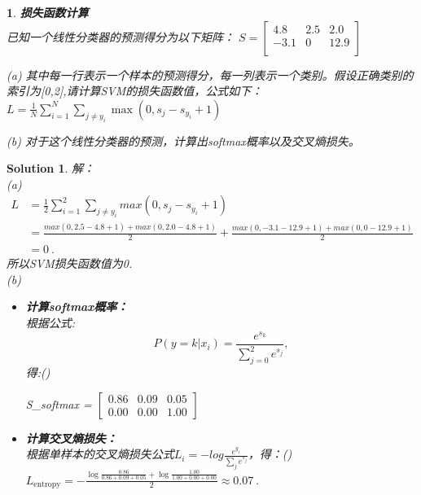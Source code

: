 \documentclass{article}
\title{\Huge\Assignment}
\author{\ID \Name \quad\href{mailto:tianym2022@smail.nju.edu.cn}{\color{magenta}\Email}}
\date{\today}
\newcommand{\myred}[1]{{\color{red}{#1}}} %
\theoremstyle{Problem}
\newtheorem{prob}{}
\theoremstyle{Solution}
\newtheorem*{sol}{Solution}
\begin{document}
	\maketitle
	\begin{prob}
		\textbf{损失函数计算}\\
		已知一个线性分类器的预测得分为以下矩阵：
		$
		S = \begin{bmatrix}
			4.8&2.5&2.0\\
			-3.1&0&12.9\\
		\end{bmatrix}
		$
		
		(a) 其中每一行表示一个样本的预测得分，每一列表示一个类别。假设正确类别的索引为[0,2],请计算SVM的损失函数值，公式如下：
		$
		L = \frac{1}{N} \sum_{i=1}^{N} \sum_{j \neq y_i} \max(0, s_j - s_{y_i} + 1)
		$
		
		
		(b) 对于这个线性分类器的预测，计算出softmax概率以及交叉熵损失。
	\end{prob}
	
	\begin{sol}
		解：\\
	(a)  \begin{align*}
		L &= \frac{1}{2}\sum_{i=1}^{2}\sum_{j\neq y_i}max(0,s_j-s_{y_i}+1)\\
		&= \frac{max(0,2.5-4.8+1)+max(0,2.0-4.8+1)}{2} + \frac{max(0,-3.1-12.9+1)+max(0,0-12.9+1)}{2}\\
		&= 0\ .
	\end{align*}
	所以SVM损失函数值为0.\\
	(b) \begin{itemize}
		\item \textbf{计算softmax概率：}\\
		根据公式:
		\[P(y=k|x_i) = \frac{e^{s_k}}{\sum_{j=0}^2 e^{s_j}},\]得:(\myred{注意我这里都保留了两位小数})
		
		S\_{softmax} = $\begin{bmatrix}
		0.86	& 0.09&0.05 \\
		0.00	&0.00 &1.00
		\end{bmatrix}$
		\item \textbf{计算交叉熵损失：}\\
		根据单样本的交叉熵损失公式$L_i = -log\frac{e^{y_i}}{\sum_j e^{s_j}}$，得：(\myred{注意我这里都保留了两位小数})
		$L_{\text{entropy}} = -\frac{\log\frac{0.86}{0.86+0.09+0.05}+\log\frac{1.00}{1.00+0.00+0.00}}{2} \approx 0.07\ .$
	\end{itemize}
	\end{sol}
	
\end{document}
